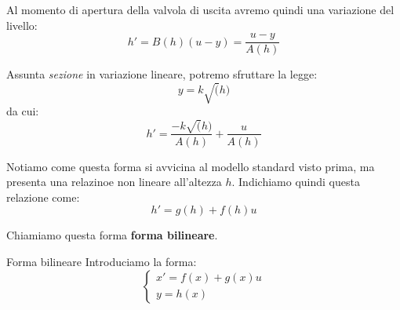 \documentclass[a4paper,11pt]{article}
\begin{document}
Al momento di apertura della valvola di uscita avremo quindi una variazione del livello:
$$
h' = B(h)(u - y) = \frac{u - y}{A(h)}
$$

Assunta \textit{sezione} in variazione lineare, potremo sfruttare la legge:
$$
y = k\sqrt(h)
$$
da cui:
$$
h' = \frac{-k\sqrt(h)}{A(h)} + \frac{u}{A(h)}
$$

Notiamo come questa forma si avvicina al modello standard visto prima, ma presenta una relazinoe non lineare all'altezza $h$.
Indichiamo quindi questa relazione come:
$$
h' = g(h) + f(h) u
$$

Chiamiamo questa forma \textbf{forma bilineare}.
\begin{definition}{Forma bilineare}
	Introduciamo la forma:
	\[
		\begin{cases}
			x' = f(x) + g(x) u \\ 
			y = h(x)
		\end{cases}
	\]
\end{definition}
\end{document}
